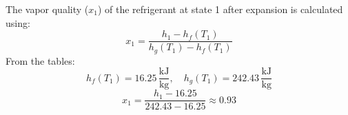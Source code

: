 The vapor quality (\(x_1\)) of the refrigerant at state 1 after expansion is calculated using:  
\[
x_1 = \frac{h_1 - h_f(T_1)}{h_g(T_1) - h_f(T_1)}
\]  
From the tables:  
\[
h_f(T_1) = 16.25 \, \frac{\text{kJ}}{\text{kg}}, \quad h_g(T_1) = 242.43 \, \frac{\text{kJ}}{\text{kg}}
\]  
\[
x_1 = \frac{h_1 - 16.25}{242.43 - 16.25} \approx 0.93
\]
